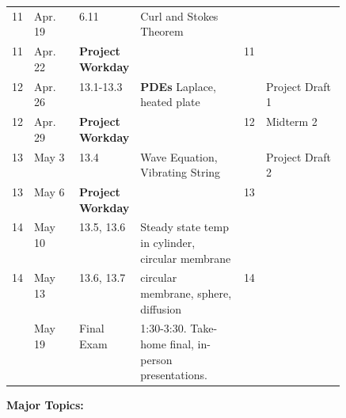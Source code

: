 \documentclass[12pt]{article}
\begin{document}
{\begin{table}[h]
\begin{tabular}{l|l|p{0.18\linewidth}|p{0.31\linewidth}|l|l}
11             & Apr. 19       &  6.11 & Curl and Stokes Theorem &  &                \\ 
11             & Apr. 22       & \textbf{Project Workday} &  & 11 &                 \\ \hline 
12            & Apr. 26      & 13.1-13.3 & \textbf{PDEs} Laplace, heated plate &  & Project Draft 1                 \\ 
12             & Apr. 29     & \textbf{Project Workday} &  & 12 &   Midterm 2               \\ \hline 
13             & May 3    & 13.4 & Wave Equation, Vibrating String &  & Project Draft 2                 \\ 
13             & May 6       & \textbf{Project Workday} &  & 13 &                 \\ \hline 
14             & May 10       &13.5, 13.6 & Steady state temp in cylinder, circular membrane &  &                  \\ 
14             & May 13       & 13.6, 13.7 & circular membrane, sphere, diffusion & 14 &                 \\ \hline \hline
              & May  19      & Final Exam & 1:30-3:30. Take-home final, in-person presentations.  &                      &                   \\ 
\end{tabular}
\end{table}



\newpage

\noindent \textbf{Major Topics:} 

}
\end{document}
